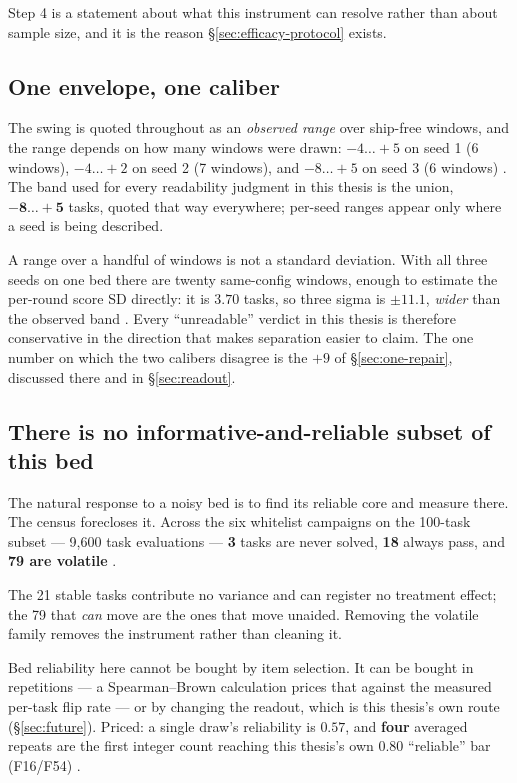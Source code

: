 Step 4 is a statement about what this instrument can resolve rather than
about sample size, and it is the reason \S\ref{sec:efficacy-protocol}
exists.

\subsection*{One envelope, one caliber}

The swing is quoted throughout as an \emph{observed range} over ship-free
windows, and the range depends on how many windows were drawn:
$-4\ldots{+}5$ on seed 1 (6 windows), $-4\ldots{+}2$ on seed 2 (7
windows), and $-8\ldots{+}5$ on seed 3 (6 windows) .
The band used for every readability judgment in this thesis is the union,
$\mathbf{-8\ldots{+}5}$ tasks, quoted that way everywhere; per-seed
ranges appear only where a seed is being described.

A range over a handful of windows is not a standard deviation. With all
three seeds on one bed there are twenty same-config windows, enough to
estimate the per-round score SD directly: it is $\mathbf{3.70}$ tasks, so
three sigma is $\pm 11.1$, \emph{wider} than the observed band .
Every ``unreadable'' verdict in this thesis is therefore conservative in
the direction that makes separation easier to claim. The one number on
which the two calibers disagree is the $+9$ of \S\ref{sec:one-repair},
discussed there and in \S\ref{sec:readout}.

\subsection*{There is no informative-and-reliable subset of this bed}

The natural response to a noisy bed is to find its reliable core and
measure there. The census forecloses it. Across the six whitelist campaigns on the 100-task subset ---
9{,}600 task evaluations --- \textbf{3} tasks are never solved,
\textbf{18} always pass, and \textbf{79 are volatile} .

The 21 stable tasks contribute no variance and can register no treatment
effect; the 79 that \emph{can} move are the ones that move unaided.
Removing the volatile family removes the instrument rather than cleaning
it.

Bed reliability here cannot be bought by item selection. It can be bought
in repetitions --- a Spearman--Brown calculation prices that against the
measured per-task flip rate --- or by changing the readout, which is this
thesis's own route (\S\ref{sec:future}). Priced: a single draw's
reliability is $0.57$, and \textbf{four} averaged repeats are the first
integer count reaching this thesis's own $0.80$ ``reliable'' bar
(F16/F54) .

